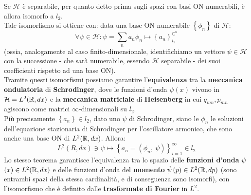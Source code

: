 \documentclass[FisicaTeorica.tex]{subfiles}
\begin{document}
Se $\mathcal{H}$ è separabile, per quanto detto prima sugli spazi con basi ON numerabili, è allora isomorfo a $l_2$.\\ Tale isomorfismo si ottiene con: data una base ON numerabile $\left\{\phi_n\right\}$ di $\mathcal{H}$:
\[
\forall \psi \in \mathcal{H}:\psi= \sum_{n}{a_n\phi_n\mapsto\left\{a_n\right\}_{l_2}^{\mathbb{C}^n}}
\]
(ossia, analogamente al caso finito-dimensionale, identifichiamo un vettore $\psi \in \mathcal{H}$ con la successione - che sarà numerabile, essendo $\mathcal{H}$ separabile - dei suoi coefficienti rispetto ad una base ON).\\

Tramite questi isomorfismi possiamo garantire l'\textbf{equivalenza} tra la \textbf{meccanica ondulatoria} di \textbf{Schrodinger}, dove le funzioni d'onda $\psi(x)$ vivono in $\mathcal{H}=L^2(\mathbb{R}, dx)$ e la \textbf{meccanica matriciale} di \textbf{Heisenberg} in cui $q_{mn}, p_{mn}$ agiscono come matrici $\infty$-dimensionali su $l_2$.\\
Più precisamente $\left\{a_n\right\}\in l_2$, dato uno $\psi$  di Schrodinger, siano le  $\phi_n$ le soluzioni dell'equazione stazionaria di Schrodinger per l'oscillatore armonico, che sono anche una base ON di $L^2(\mathbb{R}, dx)$. Allora:
\[
L^2\left(R,dx\right)\ni\psi \mapsto \left\{a_n=\left(\phi_n,\ \psi\right)\right\}_{i=1}^\infty\in l_2
\]
Lo stesso teorema garantisce l'equivalenza tra lo spazio delle \textbf{funzioni d'onda} $\psi$ $\left(x\right)\in L^2(\mathbb{R}, dx)$ e delle funzioni d'onda del \textbf{momento} $\tilde{\psi}\left(p\right)\in L^2(\mathbb{R},dp)$ (sono entrambi spazi della stessa cardinalità, e di conseguenza sono isomorfi), con l'isomorfismo che è definito dalle \textbf{trasformate di Fourier} in $L^2$.\\
\end{document}
